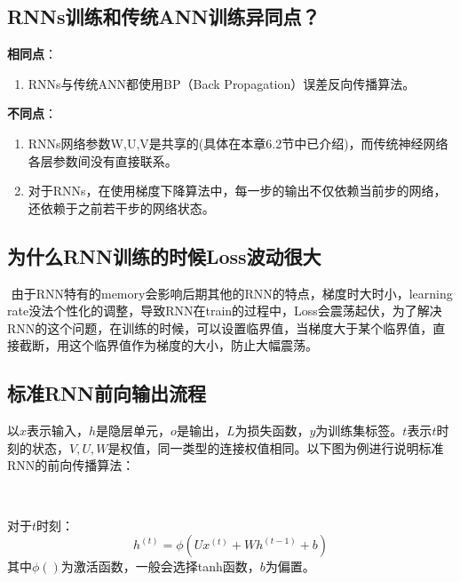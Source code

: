 \subsection{RNNs训练和传统ANN训练异同点？}\label{rnnsux8badux7ec3ux548cux4f20ux7edfannux8badux7ec3ux5f02ux540cux70b9}

\textbf{相同点}：

\begin{enumerate}
\def\labelenumi{\arabic{enumi}.}
\item
  RNNs与传统ANN都使用BP（Back Propagation）误差反向传播算法。
\end{enumerate}

\textbf{不同点}：

\begin{enumerate}
\def\labelenumi{\arabic{enumi}.}
\item
  RNNs网络参数W,U,V是共享的(具体在本章6.2节中已介绍)，而传统神经网络各层参数间没有直接联系。
\item
  对于RNNs，在使用梯度下降算法中，每一步的输出不仅依赖当前步的网络，还依赖于之前若干步的网络状态。
\end{enumerate}

\subsection{ 为什么RNN训练的时候Loss波动很大}\label{ux4e3aux4ec0ux4e48rnn-ux8badux7ec3ux7684ux65f6ux5019lossux6ce2ux52a8ux5f88ux5927}

​ 由于RNN特有的memory会影响后期其他的RNN的特点，梯度时大时小，learning
rate没法个性化的调整，导致RNN在train的过程中，Loss会震荡起伏，为了解决RNN的这个问题，在训练的时候，可以设置临界值，当梯度大于某个临界值，直接截断，用这个临界值作为梯度的大小，防止大幅震荡。

\subsection{标准RNN前向输出流程}\label{ux6807ux51c6rnnux524dux5411ux8f93ux51faux6d41ux7a0b}

​
以\(x\)表示输入，\(h\)是隐层单元，\(o\)是输出，\(L\)为损失函数，\(y\)为训练集标签。\(t\)表示\(t\)时刻的状态，\(V,U,W\)是权值，同一类型的连接权值相同。以下图为例进行说明标准RNN的前向传播算法：

​ %

对于\(t\)时刻： \[
h^{(t)}=\phi(Ux^{(t)}+Wh^{(t-1)}+b)
\] 其中\(\phi()\)为激活函数，一般会选择tanh函数，\(b\)为偏置。

